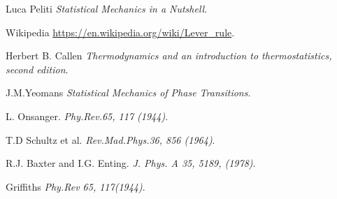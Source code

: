 
\cleardoublepage
{}
\begin{thebibliography}{99}


Luca Peliti
\textit{Statistical Mechanics in a Nutshell}.

Wikipedia 
\url{https://en.wikipedia.org/wiki/Lever_rule}.

Herbert B. Callen
\textit{Thermodynamics and an introduction to thermostatistics, second edition}.

J.M.Yeomans
\textit{Statistical Mechanics of Phase Transitions}.

L. Onsanger.
\textit{Phy.Rev.65, 117 (1944)}. 

T.D Schultz et al.
\textit{Rev.Mad.Phys.36, 856 (1964)}. 

R.J. Baxter and I.G. Enting.
\textit{J. Phys. A 35, 5189, (1978)}. 


Griffiths
\textit{Phy.Rev 65, 117(1944)}. 

 

%

\end{thebibliography}